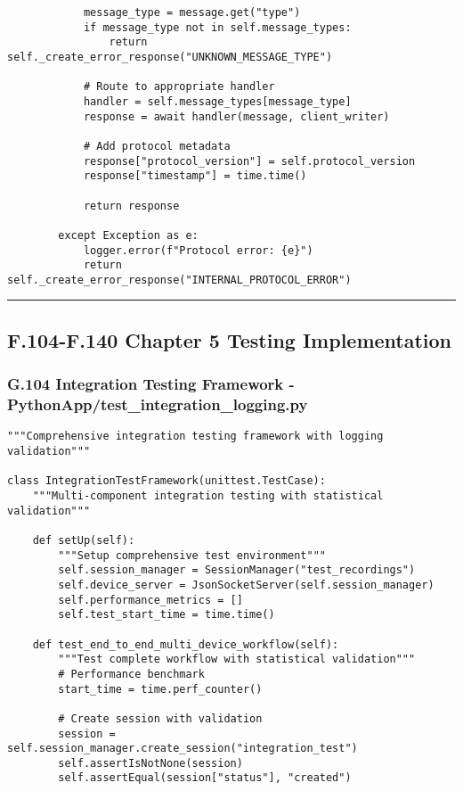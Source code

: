 \documentclass[11pt,a4paper]{article}
\begin{document}
{{\begin{verbatim}
            message_type = message.get("type")
            if message_type not in self.message_types:
                return self._create_error_response("UNKNOWN_MESSAGE_TYPE")

            # Route to appropriate handler
            handler = self.message_types[message_type]
            response = await handler(message, client_writer)

            # Add protocol metadata
            response["protocol_version"] = self.protocol_version
            response["timestamp"] = time.time()

            return response

        except Exception as e:
            logger.error(f"Protocol error: {e}")
            return self._create_error_response("INTERNAL_PROTOCOL_ERROR")
\end{verbatim}

\hrule

\subsection{F.104-F.140 Chapter 5 Testing Implementation}

\subsubsection{G.104 Integration Testing Framework - PythonApp/test_integration_logging.py}

\begin{verbatim}
"""Comprehensive integration testing framework with logging validation"""

class IntegrationTestFramework(unittest.TestCase):
    """Multi-component integration testing with statistical validation"""

    def setUp(self):
        """Setup comprehensive test environment"""
        self.session_manager = SessionManager("test_recordings")
        self.device_server = JsonSocketServer(self.session_manager)
        self.performance_metrics = []
        self.test_start_time = time.time()

    def test_end_to_end_multi_device_workflow(self):
        """Test complete workflow with statistical validation"""
        # Performance benchmark
        start_time = time.perf_counter()

        # Create session with validation
        session = self.session_manager.create_session("integration_test")
        self.assertIsNotNone(session)
        self.assertEqual(session["status"], "created")


\end{verbatim}}}
\end{document}
